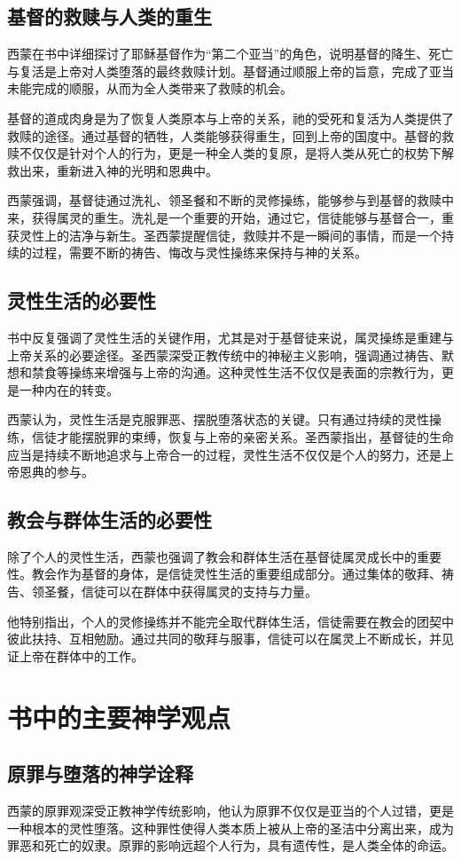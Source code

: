 \documentclass[12pt, a4paper]{ctexart}
\begin{document}
\subsection{基督的救赎与人类的重生}
西蒙在书中详细探讨了耶稣基督作为“第二个亚当”的角色，说明基督的降生、死亡与复活是上帝对人类堕落的最终救赎计划。基督通过顺服上帝的旨意，完成了亚当未能完成的顺服，从而为全人类带来了救赎的机会。

基督的道成肉身是为了恢复人类原本与上帝的关系，祂的受死和复活为人类提供了救赎的途径。通过基督的牺牲，人类能够获得重生，回到上帝的国度中。基督的救赎不仅仅是针对个人的行为，更是一种全人类的复原，是将人类从死亡的权势下解救出来，重新进入神的光明和恩典中。

西蒙强调，基督徒通过洗礼、领圣餐和不断的灵修操练，能够参与到基督的救赎中来，获得属灵的重生。洗礼是一个重要的开始，通过它，信徒能够与基督合一，重获灵性上的洁净与新生。圣西蒙提醒信徒，救赎并不是一瞬间的事情，而是一个持续的过程，需要不断的祷告、悔改与灵性操练来保持与神的关系。

\subsection{灵性生活的必要性}
书中反复强调了灵性生活的关键作用，尤其是对于基督徒来说，属灵操练是重建与上帝关系的必要途径。圣西蒙深受正教传统中的神秘主义影响，强调通过祷告、默想和禁食等操练来增强与上帝的沟通。这种灵性生活不仅仅是表面的宗教行为，更是一种内在的转变。

西蒙认为，灵性生活是克服罪恶、摆脱堕落状态的关键。只有通过持续的灵性操练，信徒才能摆脱罪的束缚，恢复与上帝的亲密关系。圣西蒙指出，基督徒的生命应当是持续不断地追求与上帝合一的过程，灵性生活不仅仅是个人的努力，还是上帝恩典的参与。

\subsection{教会与群体生活的必要性}
除了个人的灵性生活，西蒙也强调了教会和群体生活在基督徒属灵成长中的重要性。教会作为基督的身体，是信徒灵性生活的重要组成部分。通过集体的敬拜、祷告、领圣餐，信徒可以在群体中获得属灵的支持与力量。

他特别指出，个人的灵修操练并不能完全取代群体生活，信徒需要在教会的团契中彼此扶持、互相勉励。通过共同的敬拜与服事，信徒可以在属灵上不断成长，并见证上帝在群体中的工作。

\section{书中的主要神学观点}
\subsection{原罪与堕落的神学诠释}
西蒙的原罪观深受正教神学传统影响，他认为原罪不仅仅是亚当的个人过错，更是一种根本的灵性堕落。这种罪性使得人类本质上被从上帝的圣洁中分离出来，成为罪恶和死亡的奴隶。原罪的影响远超个人行为，具有遗传性，是人类全体的命运。
\end{document}

